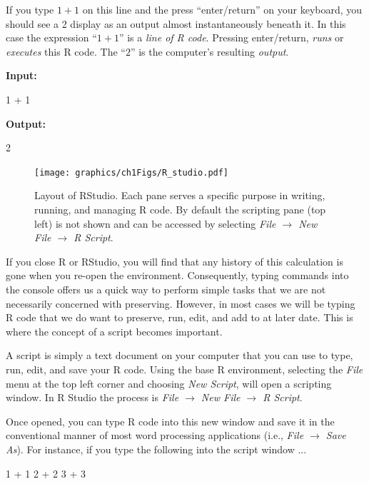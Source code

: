If you type $1 + 1$ on this line and the press ``enter/return'' on your keyboard, you should see a 2 display as an output almost instantaneously beneath it.  In this case the expression ``$1 + 1$'' is a \textit{line of R code}.  Pressing enter/return, \textit{runs} or \textit{executes} this R code. The ``$2$'' is the computer's resulting \textit{output}.

\textbf{Input:}
\begin{inR}
1 + 1
\end{inR}

\vspace{1em}

\textbf{Output:}
\begin{outR}
[1] 2
\end{outR}

\begin{figure}[h]
\centering
\texttt{[image: graphics/ch1Figs/R\_studio.pdf]}
\caption{Layout of RStudio. Each pane serves a specific purpose in writing, running, and managing R code. By default the scripting pane (top left) is not shown and can be accessed by selecting \textit{File $\rightarrow$ New File $\rightarrow$ R Script}.}
\label{fig:Rstudio}
\end{figure}


If you close R or RStudio, you will find that any history of this calculation is gone when you re-open the environment.  Consequently, typing commands into the console offers us a quick way to perform simple tasks that we are not necessarily concerned with preserving.  However, in most cases we will be typing R code that we do want to preserve, run, edit, and add to at later date.  This is where the concept of a \gls{script} becomes important.

A script is simply a text document on your computer that you can use to type, run, edit, and save your R code. Using the base R environment, selecting the \textit{File} menu at the top left corner and choosing \textit{New Script}, will open a scripting window.  In R Studio the process is \textit{File $\rightarrow$ New File $\rightarrow$ R Script}.  

Once opened, you can type R code into this new window and save it in the conventional manner of most word processing applications (i.e., \textit{File $\rightarrow$ Save As}). For instance, if you type the following into the script window ...

\begin{inR}
1 + 1
2 + 2
3 + 3
\end{inR}

